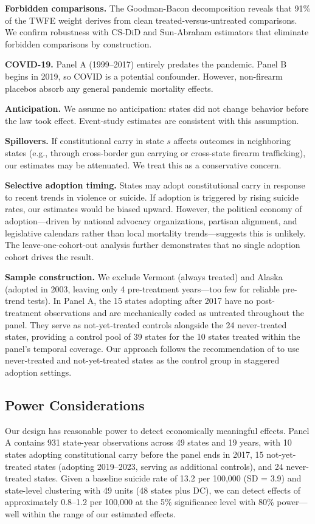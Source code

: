 \documentclass[12pt]{article}
\begin{document}
\textbf{Forbidden comparisons.} The Goodman-Bacon decomposition reveals that 91\% of the TWFE weight derives from clean treated-versus-untreated comparisons. We confirm robustness with CS-DiD and Sun-Abraham estimators that eliminate forbidden comparisons by construction.

\textbf{COVID-19.} Panel A (1999--2017) entirely predates the pandemic. Panel B begins in 2019, so COVID is a potential confounder. However, non-firearm placebos absorb any general pandemic mortality effects.

\textbf{Anticipation.} We assume no anticipation: states did not change behavior before the law took effect. Event-study estimates are consistent with this assumption.

\textbf{Spillovers.} If constitutional carry in state $s$ affects outcomes in neighboring states (e.g., through cross-border gun carrying or cross-state firearm trafficking), our estimates may be attenuated. We treat this as a conservative concern.

\textbf{Selective adoption timing.} States may adopt constitutional carry in response to recent trends in violence or suicide. If adoption is triggered by rising suicide rates, our estimates would be biased upward. However, the political economy of adoption---driven by national advocacy organizations, partisan alignment, and legislative calendars rather than local mortality trends---suggests this is unlikely. The leave-one-cohort-out analysis further demonstrates that no single adoption cohort drives the result.

\textbf{Sample construction.} We exclude Vermont (always treated) and Alaska (adopted in 2003, leaving only 4 pre-treatment years---too few for reliable pre-trend tests). In Panel A, the 15 states adopting after 2017 have no post-treatment observations and are mechanically coded as untreated throughout the panel. They serve as not-yet-treated controls alongside the 24 never-treated states, providing a control pool of 39 states for the 10 states treated within the panel's temporal coverage. Our approach follows the recommendation of \citet{callaway2021difference} to use never-treated and not-yet-treated states as the control group in staggered adoption settings.

\subsection{Power Considerations}

Our design has reasonable power to detect economically meaningful effects. Panel A contains 931 state-year observations across 49 states and 19 years, with 10 states adopting constitutional carry before the panel ends in 2017, 15 not-yet-treated states (adopting 2019--2023, serving as additional controls), and 24 never-treated states. Given a baseline suicide rate of 13.2 per 100,000 (SD = 3.9) and state-level clustering with 49 units (48 states plus DC), we can detect effects of approximately 0.8--1.2 per 100,000 at the 5\% significance level with 80\% power---well within the range of our estimated effects.
\end{document}
